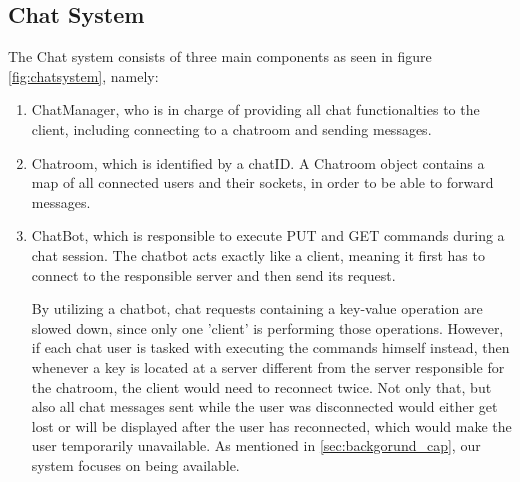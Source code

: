 \subsection{Chat System}
\label{sec:implementation_chatsystem}
The Chat system consists of three main components as seen in figure \ref{fig:chatsystem}, namely:
\begin{enumerate}
	\item ChatManager, who is in charge of providing all chat functionalties to the client, including connecting to a chatroom and sending messages.
	\item Chatroom, which is identified by a chatID. A Chatroom object contains a map of all connected users and their sockets, in order to be able to forward messages.
	\item ChatBot, which is responsible to execute PUT and GET commands during a chat session. The chatbot acts exactly like a client, meaning it first has to connect to the responsible server and then send its request.
	
	 By utilizing a chatbot, chat requests containing a key-value operation are slowed down, since only one 'client' is performing those operations. However, if each chat user is tasked with executing the commands himself instead, then whenever a key is located at a server different from the server responsible for the chatroom, the client would need to reconnect twice. Not only that, but also all chat messages sent while the user was disconnected would either get lost or will be displayed after the user has reconnected, which would make the user temporarily unavailable. As mentioned in \ref{sec:backgorund_cap}, our system focuses on being available.
\end{enumerate}